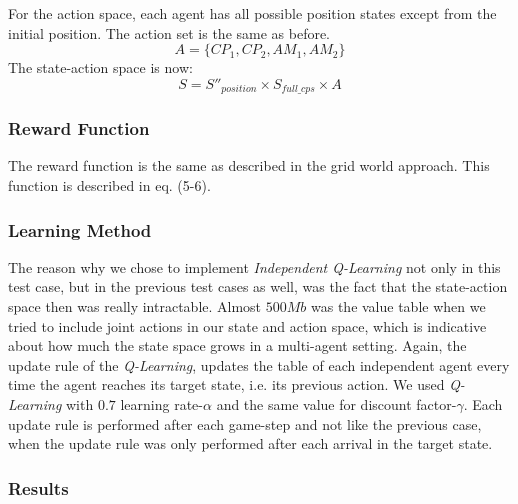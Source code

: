 \documentclass[conference]{IEEEtran}
\begin{document}
For the action space, each agent has all possible position states except from the initial position.
The action set is the same as before.
\begin{equation}
A = \lbrace CP_1, CP_2, AM_1, AM_2 \rbrace
\end{equation}
The state-action space is now:
\begin{equation}
S = S''_{position} \times S_{full\_cps} \times A
\end{equation}
\subsubsection{Reward Function}
The reward function is the same as described in the grid world approach. This function is described in eq. (5-6).
\subsubsection{Learning Method}
The reason why we chose to implement \textit{Independent Q-Learning} not only in this test case, but in the previous test cases as well, was the fact that the state-action space then was really intractable. Almost $500Mb$ was the value table when we tried to include joint actions in our state and action space, which is indicative about how much the state space grows in a multi-agent setting.
Again, the update rule of the \textit{Q-Learning}, updates the table of each independent agent every time the agent reaches its target state, i.e. its previous action. We used \textit{Q-Learning} with $0.7$ learning rate-$\alpha$ and the same value for discount factor-$\gamma$. Each update rule is performed after each game-step and not like the previous case, when the update rule was only performed after each arrival in the target state.
\subsubsection{Results}


\subsection{}

\newpage
\printbibliography 

\end{document}
